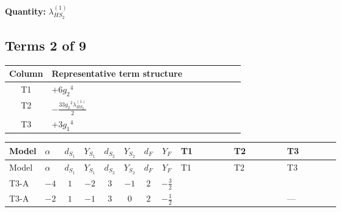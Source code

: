 \documentclass[8pt]{article}
\begin{document}
\begin{landscape}
\begin{longtable}{@{}llcccccc >{\raggedright\arraybackslash}p{0.21\linewidth} >{\raggedright\arraybackslash}p{0.21\linewidth} >{\raggedright\arraybackslash}p{0.21\linewidth}@{}}
\midrule
\bottomrule
\end{longtable}
\clearpage
\noindent\textbf{Quantity: }$\lambda_{HS_2}^{(1)}$\par\smallskip
\subsection*{Terms 2 of 9}
\begin{center}
\begin{tabular}{@{}c >{\raggedright\arraybackslash}p{0.82\linewidth}@{}}
\toprule
Column & Representative term structure \\
\midrule
T1 & \(\displaystyle +6 {g_2}^4\) \\
\midrule
T2 & \(\displaystyle -\frac{33 {g_2}^2 {\lambda_{HS_2}^{(1)}}}{2}\) \\
\midrule
T3 & \(\displaystyle +3 {g_1}^4\) \\
\midrule
\bottomrule
\end{tabular}
\end{center}
\smallskip
\tiny
\begin{longtable}{@{}llcccccc >{\raggedright\arraybackslash}p{0.21\linewidth} >{\raggedright\arraybackslash}p{0.21\linewidth} >{\raggedright\arraybackslash}p{0.21\linewidth}@{}}
\toprule
Model & $\alpha$ & $d_{S_1}$ & $Y_{S_1}$ & $d_{S_2}$ & $Y_{S_2}$ & $d_F$ & $Y_F$ & T1 & T2 & T3 \\
\midrule
\endfirsthead
\toprule
Model & $\alpha$ & $d_{S_1}$ & $Y_{S_1}$ & $d_{S_2}$ & $Y_{S_2}$ & $d_F$ & $Y_F$ & T1 & T2 & T3 \\
\midrule
\endhead
T3-A & $-4$ & $1$ & $-2$ & $3$ & $-1$ & $2$ & $-\frac{3}{2}$ & \scriptsize\adjustbox{max width=\linewidth}{$\begin{gathered} +6 {g_2}^4\end{gathered}$} & \scriptsize\adjustbox{max width=\linewidth}{$\begin{gathered} -\frac{33 {g_2}^2 {\lambda_{HS_2}^{(1)}}}{2}\end{gathered}$} & \scriptsize\adjustbox{max width=\linewidth}{$\begin{gathered} +3 {g_1}^4\end{gathered}$} \\
\midrule
T3-A & $-2$ & $1$ & $-1$ & $3$ & $0$ & $2$ & $-\frac{1}{2}$ & \scriptsize\adjustbox{max width=\linewidth}{$\begin{gathered} +6 {g_2}^4\end{gathered}$} & \scriptsize\adjustbox{max width=\linewidth}{$\begin{gathered} -\frac{33 {g_2}^2 {\lambda_{HS_2}^{(1)}}}{2}\end{gathered}$} & --- \\

\end{longtable}
\end{landscape}
\end{document}
